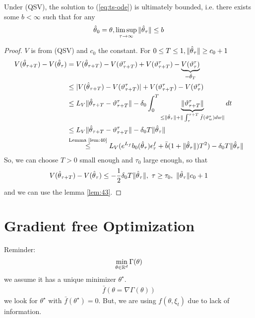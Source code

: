 \begin{proposition}\label{prop:44}
    Under (QSV), the solution to (\ref{eq:ts-ode}) is ultimately bounded, i.e. there exists 
    some \(b<\infty\) such that for any 
    \begin{align*}
        {\hat{\theta}}_0=\theta,\limsup_{\tau\to\infty}\Vert {\hat{\theta}}_\tau\Vert \leq b
    \end{align*}
\end{proposition}

\begin{proof}
    \(V\) is from (QSV) and \(c_0\) the constant. For \(0\leq T\leq 1,\Vert {\hat{\theta}}_\tau\Vert\geq c_0+1\)
    \begin{align*}
        V({\hat{\theta}}_{\tau+T})-V({\hat{\theta}}_\tau)&=V({\hat{\theta}}_{\tau+T})-V(\vartheta_{\tau+T}^\tau)+V(\vartheta_{\tau+T}^\tau)-\underbrace{V(\vartheta_{\tau}^\tau)}_{={\hat{\theta}}_T}\\
        &\leq \vert V({\hat{\theta}}_{\tau+T})-V(\vartheta_{\tau+T}^\tau)\vert+V(\vartheta_{\tau+T}^\tau)-V(\vartheta_{\tau}^\tau)\\
        &\leq L_V\Vert {\hat{\theta}}_{\tau+T}-\vartheta_{\tau+T}^\tau\Vert - \delta_0\int_0^T\underbrace{\Vert \vartheta_{\tau+T}^\tau\Vert}_{\leq \Vert {\hat{\theta}}_\tau\Vert +\Vert \int_\tau^{\tau+T} \bar{f}(\vartheta_w^\tau)dw\Vert} dt\\
        &\leq L_V\Vert {\hat{\theta}}_{\tau+T}-\vartheta_{\tau+T}^\tau\Vert-\delta_0T\Vert {\hat{\theta}}_\tau\Vert\\
        &\stackrel{\text{Lemma \ref{lem:40}}}{\leq} L_V(e^{L_f}b_0({\hat{\theta}}_\tau)\epsilon_\tau^f+\bar{b}(1+\Vert{\hat{\theta}}_\tau\Vert)T^2)-\delta_0T\Vert {\hat{\theta}}_\tau\Vert
    \end{align*}
    So, we can choose \(T>0\) small enough and 
    \(\tau_0\) large enough, so that 
    \[V(\thetahat_{\tau+T})-V(\thetahat_\tau)\leq -\frac{1}{2}\delta_0 T\Vert \thetahat_\tau\Vert,\ \tau\geq \tau_0,\ \Vert \thetahat_\tau\Vert c_0+1\]
    and we can use the lemma \ref{lem:43}.


\end{proof}


\section{Gradient free Optimization}

Reminder: \[\min_{\theta\in\mathbb{R}^d}\Gamma(\theta)\] 
we assume it has a unique minimizer \(\theta^\star\).
\begin{align*}
    \bar{f}(\theta=\nabla\Gamma(\theta))
\end{align*}
we look for \(\theta^\star\) with \(\bar{f}(\theta^\star)=0\). But,
we are using \(f(\theta,\xi_t)\) due to lack of information.

